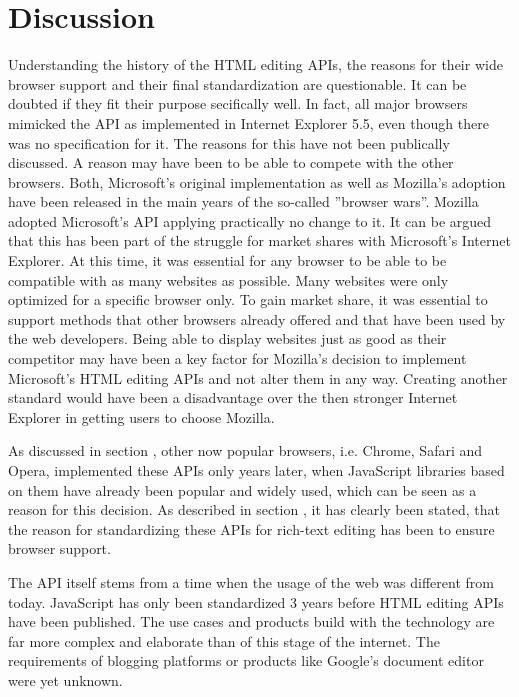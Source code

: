 
\section{Discussion}

Understanding the history of the HTML editing APIs, the reasons for their wide browser support and their final standardization are questionable. It can be doubted if they fit their purpose secifically well. In fact, all major browsers mimicked the API as implemented in Internet Explorer 5.5, even though there was no specification for it. The reasons for this have not been publically discussed. A reason may have been to be able to compete with the other browsers. Both, Microsoft's original implementation as well as Mozilla's adoption have been released in the main years of the so-called ''browser wars''. Mozilla adopted Microsoft's API applying practically no change to it. It can be argued that this has been part of the struggle for market shares with Microsoft's Internet Explorer. At this time, it was essential for any browser to be able to be compatible with as many websites as possible. Many websites were only optimized for a specific browser only. To gain market share, it was essential to support methods that other browsers already offered and that have been used by the web developers. Being able to display websites just as good as their competitor may have been a key factor for Mozilla's decision to implement Microsoft's HTML editing APIs and not alter them in any way. Creating another standard would have been a disadvantage over the then stronger Internet Explorer in getting users to choose Mozilla. 

As discussed in section , other now popular browsers, i.e. Chrome, Safari and Opera, implemented these APIs only years later, when JavaScript libraries based on them have already been popular and widely used, which can be seen as a reason for this decision. As described in section , it has clearly been stated, that the reason for standardizing these APIs for rich-text editing has been to ensure browser support.

The API itself stems from a time when the usage of the web was different from today. JavaScript has only been standardized 3 years before HTML editing APIs have been published. The use cases and products build with the technology are far more complex and elaborate than of this stage of the internet. The requirements of blogging platforms or products like Google's document editor were yet unknown. %

